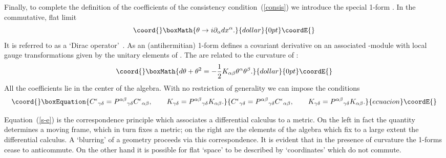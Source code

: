 \documentclass[12pt,a4paper]{article}
\newcounter{eg}
\def\c#1{{\cal #1}}
\def\kbar{{\mathchar'26\mkern-9muk}}
\begin{document}
Finally, to complete the definition of the coefficients of the
consistency condition~(\ref{consis}) we introduce the special 1-form 
\myHighlight{$\theta = -\lambda_\alpha\theta^\alpha$}\coordHE{}. In the commutative, flat limit
$$\coord{}\boxMath{
\theta \rightarrow i\partial_\alpha dx^\alpha.
}{dollar}{0pt}\coordE{}$$
It is referred to as a `Dirac operator'~\cite{Con94}. As an
(antihermitian) 1-form \myHighlight{$\theta$}\coordHE{} defines a covariant derivative on an
associated \myHighlight{$\c{A}$}\coordHE{}-module with local gauge transformations given by
the unitary elements of \myHighlight{$\c{A}$}\coordHE{}.  The \coordHE{} are related to
the curvature of \myHighlight{$\theta$}\coordHE{}:
$$\coord{}\boxMath{
d\theta + \theta^2 = - {1\over 2} K_{\alpha\beta} \theta^\alpha \theta^\beta.
}{dollar}{0pt}\coordE{}$$
All the coefficients lie in the center \myHighlight{$\c{Z}(\c{A}_\kbar)$}\coordHE{} of the algebra.
With no restriction of generality we can impose the conditions
\begin{equation}\coord{}\boxEquation{
C^\epsilon{}_{\gamma\delta} = 
P^{\alpha\beta}{}_{\gamma\delta} C^\epsilon{}_{\alpha\beta}, \qquad 
K_{\gamma\delta} = 
P^{\alpha\beta}{}_{\gamma\delta} K_{\alpha\beta}.              \label{C-con}
}{
C^\epsilon{}_{\gamma\delta} = 
P^{\alpha\beta}{}_{\gamma\delta} C^\epsilon{}_{\alpha\beta}, \qquad 
K_{\gamma\delta} = 
P^{\alpha\beta}{}_{\gamma\delta} K_{\alpha\beta}.              }{ecuacion}\coordE{}\end{equation}

Equation~(\ref{s-e}) is the correspondence principle which associates
a differential calculus to a metric.  On the left in fact the quantity
\coordHE{} determines a moving frame, which in turn
fixes a metric; on the right are the elements of the algebra which fix
to a large extent the differential calculus. A `blurring' of a
geometry proceeds via this correspondence. It is evident that in the
presence of curvature the 1-forms cease to anticommute. On the other
hand it is possible for flat `space' to be described by `coordinates'
which do not commute.  
\end{document}
